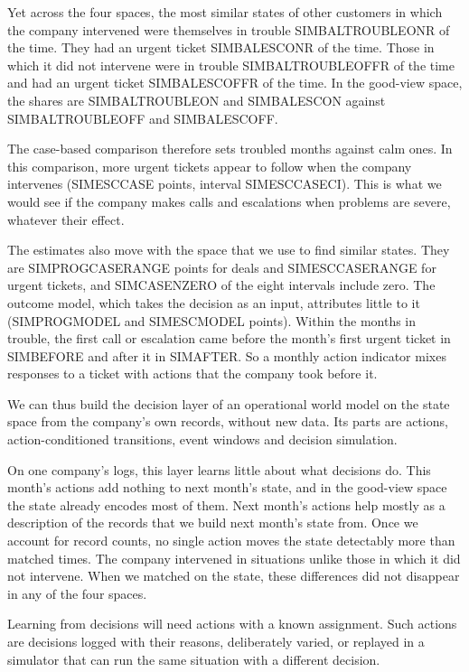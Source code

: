 \documentclass[11pt]{article}
\begin{document}
Yet across the four spaces, the most similar states of other customers in which the company intervened were themselves in trouble SIMBALTROUBLEONR of the time. They had an urgent ticket SIMBALESCONR of the time. Those in which it did not intervene were in trouble SIMBALTROUBLEOFFR of the time and had an urgent ticket SIMBALESCOFFR of the time. In the good-view space, the shares are SIMBALTROUBLEON and SIMBALESCON against SIMBALTROUBLEOFF and SIMBALESCOFF.

The case-based comparison therefore sets troubled months against calm ones. In this comparison, more urgent tickets appear to follow when the company intervenes (SIMESCCASE points, interval SIMESCCASECI). This is what we would see if the company makes calls and escalations when problems are severe, whatever their effect.

The estimates also move with the space that we use to find similar states. They are SIMPROGCASERANGE points for deals and SIMESCCASERANGE for urgent tickets, and SIMCASENZERO of the eight intervals include zero. The outcome model, which takes the decision as an input, attributes little to it (SIMPROGMODEL and SIMESCMODEL points). Within the months in trouble, the first call or escalation came before the month's first urgent ticket in SIMBEFORE and after it in SIMAFTER. So a monthly action indicator mixes responses to a ticket with actions that the company took before it.

We can thus build the decision layer of an operational world model on the state space from the company's own records, without new data. Its parts are actions, action-conditioned transitions, event windows and decision simulation.

On one company's logs, this layer learns little about what decisions do. This month's actions add nothing to next month's state, and in the good-view space the state already encodes most of them. Next month's actions help mostly as a description of the records that we build next month's state from. Once we account for record counts, no single action moves the state detectably more than matched times. The company intervened in situations unlike those in which it did not intervene. When we matched on the state, these differences did not disappear in any of the four spaces.

Learning from decisions will need actions with a known assignment. Such actions are decisions logged with their reasons, deliberately varied, or replayed in a simulator that can run the same situation with a different decision.
\end{document}
